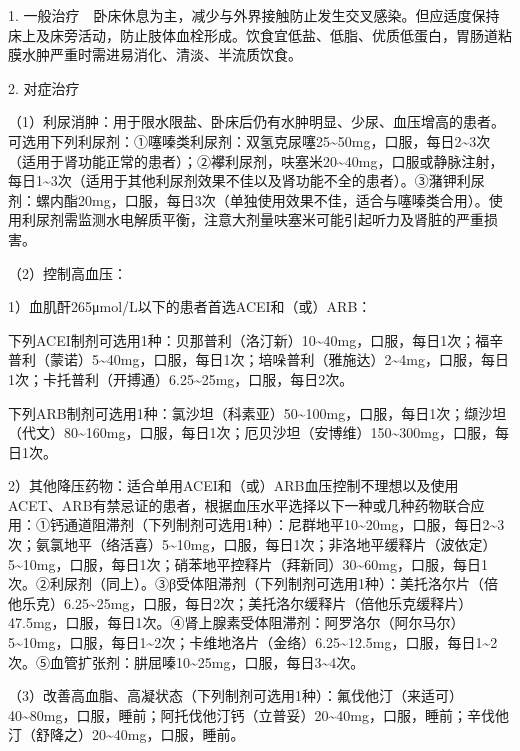 1.
一般治疗　卧床休息为主，减少与外界接触防止发生交叉感染。但应适度保持床上及床旁活动，防止肢体血栓形成。饮食宜低盐、低脂、优质低蛋白，胃肠道粘膜水肿严重时需进易消化、清淡、半流质饮食。

2. 对症治疗

（1）利尿消肿：用于限水限盐、卧床后仍有水肿明显、少尿、血压增高的患者。可选用下列利尿剂：①噻嗪类利尿剂：双氢克尿噻25\textasciitilde{}50mg，口服，每日2\textasciitilde{}3次（适用于肾功能正常的患者）；②襻利尿剂，呋塞米20\textasciitilde{}40mg，口服或静脉注射，每日1\textasciitilde{}3次（适用于其他利尿剂效果不佳以及肾功能不全的患者）。③潴钾利尿剂：螺内酯20mg，口服，每日3次（单独使用效果不佳，适合与噻嗪类合用）。使用利尿剂需监测水电解质平衡，注意大剂量呋塞米可能引起听力及肾脏的严重损害。

（2）控制高血压：

1）血肌酐265μmol/L以下的患者首选ACEI和（或）ARB：

下列ACEI制剂可选用1种：贝那普利（洛汀新）10\textasciitilde{}40mg，口服，每日1次；福辛普利（蒙诺）5\textasciitilde{}40mg，口服，每日1次；培哚普利（雅施达）2\textasciitilde{}4mg，口服，每日1次；卡托普利（开搏通）6.25\textasciitilde{}25mg，口服，每日2次。

下列ARB制剂可选用1种：氯沙坦（科素亚）50\textasciitilde{}100mg，口服，每日1次；缬沙坦（代文）80\textasciitilde{}160mg，口服，每日1次；厄贝沙坦（安博维）150\textasciitilde{}300mg，口服，每日1次。

2）其他降压药物：适合单用ACEI和（或）ARB血压控制不理想以及使用ACET、ARB有禁忌证的患者，根据血压水平选择以下一种或几种药物联合应用：①钙通道阻滞剂（下列制剂可选用1种）：尼群地平10\textasciitilde{}20mg，口服，每日2\textasciitilde{}3次；氨氯地平（络活喜）5\textasciitilde{}10mg，口服，每日1次；非洛地平缓释片（波依定）5\textasciitilde{}10mg，口服，每日1次；硝苯地平控释片（拜新同）30\textasciitilde{}60mg，口服，每日1次。②利尿剂（同上）。③β受体阻滞剂（下列制剂可选用1种）：美托洛尔片（倍他乐克）6.25\textasciitilde{}25mg，口服，每日2次；美托洛尔缓释片（倍他乐克缓释片）47.5mg，口服，每日1次。④肾上腺素受体阻滞剂：阿罗洛尔（阿尔马尔）5\textasciitilde{}10mg，口服，每日1\textasciitilde{}2次；卡维地洛片（金络）6.25\textasciitilde{}12.5mg，口服，每日1\textasciitilde{}2次。⑤血管扩张剂：肼屈嗪10\textasciitilde{}25mg，口服，每日3\textasciitilde{}4次。

（3）改善高血脂、高凝状态（下列制剂可选用1种）：氟伐他汀（来适可）40\textasciitilde{}80mg，口服，睡前；阿托伐他汀钙（立普妥）20\textasciitilde{}40mg，口服，睡前；辛伐他汀（舒降之）20\textasciitilde{}40mg，口服，睡前。

